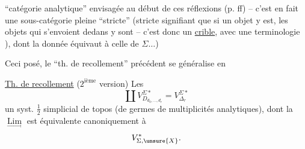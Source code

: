 ``catégorie analytique'' envisagée au début de ces réflexions (p. ff) -- c'est en fait une sous-catégorie pleine ``stricte'' (stricte signifiant que si un objet y est, les objets qui s'envoient dedans y sont -- c'est donc un \uline{crible}, avec une terminologie ), dont la donnée équivaut à celle de \deleted{$\unsure{\Theta}$} $\Sigma\ldots$)

Ceci posé, le ``th. de recollement'' précédent se généralise en

\uline{Th. de recollement} ($2^{\text{ième}}$ version) Les
\[
\coprod V_{D_{d_0,\ldots,d_r}}^{\Sigma *}=V_{\Delta_r}^{\Sigma *}
\]
 un syst. $\frac12$ simplicial de topos (de germes de multiplicités analytiques), dont la $\underset{\longrightarrow}{\operatorname{Lim}}$ est équivalente canoniquement à
\[
V^*_{\Sigma,\unsure{X}}.
\]
